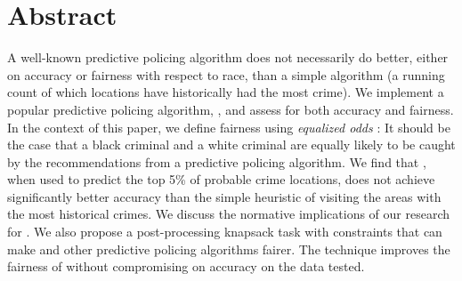 \begingroup
\let\clearpage\relax
\let\cleardoublepage\relax
\let\cleardoublepage\relax

\chapter*{Abstract}
A well-known predictive policing algorithm does not necessarily do better, either on accuracy or fairness with respect to race, than a simple algorithm (a running count of which locations have historically had the most crime). We implement a popular predictive policing algorithm, \pp, and assess \pp for both accuracy and fairness. In the context of this paper, we define fairness using \emph{equalized odds} \citep{hardt_equality_2016}: It should be the case that a black criminal and a white criminal are equally likely to be caught by the recommendations from a predictive policing algorithm. We find that \pp, when used to predict the top 5\% of probable crime locations, does not achieve significantly better accuracy than the simple heuristic of visiting the areas with the most historical crimes. We discuss the normative implications of our research for \pp. We also propose a post-processing knapsack task with constraints that can make \pp and other predictive policing algorithms fairer. The technique improves the fairness of \pp without compromising on accuracy on the data tested.

\endgroup

\vfill
